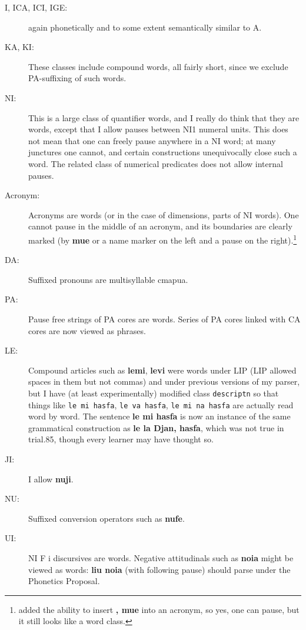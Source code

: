 \documentclass[12pt]{book}
\begin{document}
{\begin{description}
\item[I, ICA, ICI, IGE:]  again phonetically and to some extent semantically similar to A.

\item[KA, KI:]  These classes include compound words, all fairly short, since we exclude PA-suffixing of such words.

\item[NI:]  This is a large class of quantifier words, and I really do think that they are words, except that I allow pauses
between NI1  numeral units.  This does not mean that one can freely pause anywhere in a NI word; at many junctures one cannot,
and certain constructions unequivocally close such a word.  The related class of numerical predicates does not allow internal pauses.

\item[Acronym:]  Acronyms are words (or in the case of dimensions, parts of NI words).  One cannot pause in the middle of an acronym,
and its boundaries are clearly marked (by {\bf mue} or a name marker on the left and a pause on the right).\footnote{added the ability to insert {\bf , mue} into an acronym, so yes, one can pause, but it still looks like a word class.}

\item[DA:]  Suffixed pronouns are multisyllable cmapua.

\item[PA:]  Pause free strings of PA cores are words.  Series of PA cores  linked with CA cores are now viewed as phrases.

\item[LE:]  Compound articles such as {\bf lemi}, {\bf levi} were words under LIP (LIP allowed spaces in them but not commas) and under previous versions of my parser,
but I have (at least experimentally) modified class {\tt descriptn} so that things like {\tt le mi hasfa}, {\tt le va hasfa}, {\tt le mi na hasfa} are actually read word by word.
The sentence {\bf le mi hasfa} is now an instance of the same grammatical construction as {\bf le la Djan, hasfa}, which was not true in trial.85, though every learner may have thought so.

\item[JI:]  I allow {\bf nuji}.

\item[NU:]  Suffixed conversion operators such as {\bf nufe}.

\item[UI:]  NI F i discursives are words.  Negative attitudinals such as {\bf noia} might be viewed as words:  {\bf liu noia} (with following pause) should parse under the Phonetics Proposal.


\end{description}}
\end{document}
